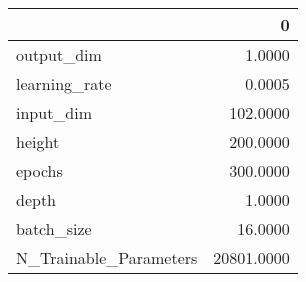 \begin{tabular}{lr}
\toprule
{} &           0 \\
\midrule
output\_dim             &      1.0000 \\
learning\_rate          &      0.0005 \\
input\_dim              &    102.0000 \\
height                 &    200.0000 \\
epochs                 &    300.0000 \\
depth                  &      1.0000 \\
batch\_size             &     16.0000 \\
N\_Trainable\_Parameters &  20801.0000 \\
\bottomrule
\end{tabular}
